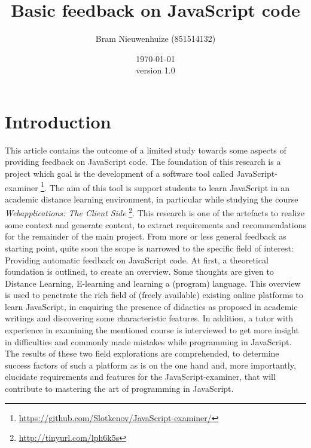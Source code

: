 \documentclass{article}
\begin{document}
 

\title{Basic feedback on JavaScript code} \author{Bram Nieuwenhuize (851514132)} 
\date{\today \\version 1.0} \maketitle 

\section{Introduction} This article contains the outcome of a limited study 
towards 
some aspects of providing feedback on JavaScript code. The foundation of this 
research is a project which goal is the development of a software tool called 
JavaScript-examiner
\footnote{\url{https://github.com/Slotkenov/JavaScript-examiner/}}.
The aim of this tool is support students to learn 
JavaScript in an academic distance learning environment, in particular
while studying the course {\em Webapplications: The Client Side}
\footnote{\url{http://tinyurl.com/lph6k5s}}. This research is one of 
the artefacts to realize some context and generate content, to extract 
requirements and recommendations for the remainder of the main project. \newline 
From more or less general feedback as starting point, quite soon the scope is 
narrowed to the specific field of interest: Providing automatic feedback on 
JavaScript code. At first, a theoretical foundation is outlined, to create an 
overview. Some thoughts are given to Distance Learning, E-learning and 
learning a (program) language.
This overview is used to penetrate the rich field of (freely 
available) existing online platforms to learn JavaScript, in enquiring the
presence of didactics as proposed in academic writings and discovering some 
characteristic features. In addition, a tutor with experience in examining
the mentioned course is 
interviewed to get more insight in difficulties and commonly made mistakes while 
programming in JavaScript. The results of these two field explorations are 
comprehended, to determine success factors of such a platform as is on the one 
hand and, more importantly, elucidate requirements and features for the 
JavaScript-examiner, that will contribute to mastering the art of programming in 
JavaScript. 
\end{document}
